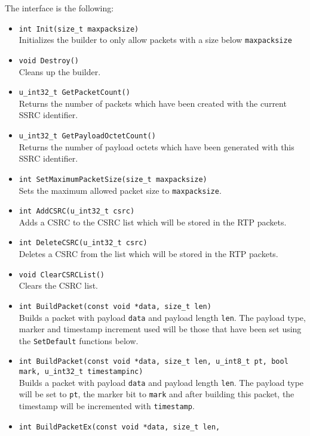 \documentclass[12pt,a4paper]{article}
\begin{document}
				The interface is the following:
				\begin{itemize}
					\item {\tt int Init(size\_t maxpacksize)}\\
						Initializes the builder to only allow packets with a size
						below {\tt maxpacksize}
					\item {\tt void Destroy()}\\
						Cleans up the builder.
					\item {\tt u\_int32\_t GetPacketCount()}\\
						Returns the number of packets which have been created with
						the current SSRC identifier.
					\item {\tt u\_int32\_t GetPayloadOctetCount()}\\
						Returns the number of payload octets which have been generated
						with this SSRC identifier.
					\item {\tt int SetMaximumPacketSize(size\_t maxpacksize)}\\
						Sets the maximum allowed packet size to {\tt maxpacksize}.
					\item {\tt int AddCSRC(u\_int32\_t csrc)}\\
						Adds a CSRC to the CSRC list which will be stored in the
						RTP packets.
					\item {\tt int DeleteCSRC(u\_int32\_t csrc)}\\
						Deletes a CSRC from the list which will be stored in the
						RTP packets.
					\item {\tt void ClearCSRCList()}\\
						Clears the CSRC list.
					\item {\tt int BuildPacket(const void *data, size\_t len)}\\
						Builds a packet with payload {\tt data} and payload length
						{\tt len}. The payload type, marker and timestamp increment
						used will be those that have been set using the 
						{\tt SetDefault} functions below.
					\item {\tt int BuildPacket(const void *data, size\_t len,
					                           u\_int8\_t pt, bool mark, u\_int32\_t timestampinc)}\\
						Builds a packet with payload {\tt data} and payload length
						{\tt len}. The payload type will be set to {\tt pt}, the
						marker bit to {\tt mark} and after building this packet,
						the timestamp will be incremented with {\tt timestamp}.
					\item {\tt int BuildPacketEx(const void *data, size\_t len,
}
\end{itemize}
\end{document}
